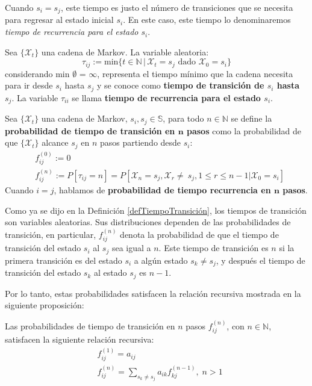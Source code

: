 Cuando $s_i=s_j$, este tiempo es justo el número de transiciones que se necesita para regresar al estado inicial $s_i$. En este caso, este tiempo lo denominaremos \textit{tiempo de recurrencia para el estado $s_i$}.

\begin{definition}\label{defTiempoTransición}
Sea $\{\mathcal{X}_t\}$ una cadena de Markov. La variable aleatoria:
\[\tau_{ij} :=  \text{min}\{t\in\mathbb{N}\,|\, \mathcal{X}_t=s_j \text{ dado } \mathcal{X}_0=s_i\}\] 
considerando min $\emptyset$ = $\infty$, representa el tiempo mínimo que la cadena necesita para ir desde $s_i$ hasta $s_j$ y se conoce como \textbf{tiempo de transición de $s_i$ hasta $s_j$}. La variable $\tau_{ii}$ se llama \textbf{tiempo de recurrencia para el estado $s_i$}.
\end{definition}

\begin{definition}
Sea $\{\mathcal{X}_t\}$ una cadena de Markov, $s_i,s_j\in\mathbb{S}$, para todo $n\in\mathbb{N}$ se define la \textbf{probabilidad de tiempo de transición en $\bm{n}$ pasos} como la probabilidad de que $\{\mathcal{X}_t\}$ alcance $s_j$ en $n$ pasos partiendo desde $s_i$:
\[\begin{aligned}
&f_{ij}^{(0)}:=0 \\
&f_{ij}^{(n)}:=P[\tau_{ij}=n]=P[\mathcal{X}_n=s_j, \mathcal{X}_r\neq\ s_j, 1\leq r\leq n-1|\mathcal{X}_0=s_i]
\end{aligned}
\]
Cuando $i=j$, hablamos de \textbf{probabilidad de tiempo recurrencia en $\bm{n}$ pasos}.
\end{definition}

Como ya se dijo en la Definición \ref{defTiempoTransición}, los tiempos de transición son variables aleatorias. Sus distribuciones dependen de las probabilidades de transición, en particular, $f_{ij}^{(n)}$ denota la probabilidad de que el tiempo de transición del estado $s_i$ al $s_j$ sea igual a $n$. Este tiempo de transición es $n$ si la primera transición es del estado $s_i$ a algún estado $s_k\neq s_j$, y después el tiempo de transición del estado $s_k$ al estado $s_j$ es $n-1$.

Por lo tanto, estas probabilidades satisfacen la relación recursiva mostrada en la siguiente proposición:
\begin{proposition}\label{ecTiempoTransiciónNPasos}
    Las probabilidades de tiempo de transición en $n$ pasos $f_{ij}^{(n)}$, con $n\in\mathbb{N}$, satisfacen la siguiente relación recursiva:
    \[
    \begin{aligned}
        &f_{ij}^{(1)}=a_{ij}\\
        &f_{ij}^{(n)}=\sum_{s_k\neq s_j} a_{ik} f_{kj}^{(n-1)},\;n>1
    \end{aligned}
    \]
\end{proposition}

